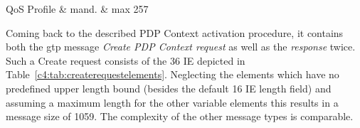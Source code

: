 \begin{table}[htbp]
\begin{tabu}
		\gls{QoS} Profile & mand. & max \SI{257}{\byte} \\
		\bottomrule
	\end{tabu}%
\end{table}

Coming back to the described \gls{PDP} Context activation procedure, it contains both the \gls{gtp} message \textit{Create \gls{PDP} Context request} as well as the \textit{response} twice. Such a Create request consists of the 36 \gls{IE} depicted in Table~\ref{c4:tab:createrequestelements}. Neglecting the elements which have no predefined upper length bound (besides the default \SI{16}{\bit} \gls{IE} length field) and assuming a maximum length for the other variable elements this results in a message size of \SI{1059}{\byte}. The complexity of the other message types is comparable.

